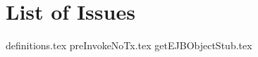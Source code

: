 \section{List of Issues} %
\label{sec:list_of_issues}
{definitions.tex}
{preInvokeNoTx.tex}
{getEJBObjectStub.tex}

